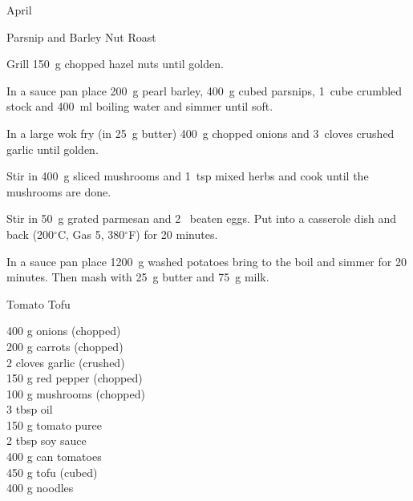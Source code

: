 \begin{menu}{April}
\begin{recipe}{2}{Parsnip and Barley Nut Roast}
\begin{ingredients}
		\end{ingredients}
	
	
    \begin{instructions}
    \item 
        Grill 150~g chopped hazel nuts until golden.
      \item 
        In a sauce pan
        place
        200~g  pearl barley,
        400~g cubed parsnips,
        1~cube crumbled stock
        and
        400~ml  boiling water
        and simmer until soft.
      \item 
        In a large wok fry
        (in 25~g  butter)
        400~g chopped onions
        and
        3~cloves crushed garlic
        until golden.
      \item 
        Stir in
        400~g sliced mushrooms
        and
        1~tsp  mixed herbs
        and cook until the mushrooms are done.
      \item 
        Stir in
        50~g grated parmesan
        and
        2~ beaten eggs.
        Put into a
        casserole dish
        and back
        (200$^{\circ}$C, Gas 5, 380$^{\circ}$F)
        for 20 minutes.
      \item 
    In a sauce pan place
    1200~g washed potatoes
    bring to the boil and simmer for 20 minutes.
    Then mash with
    25~g  butter
    and
    75~g  milk.
  
    \end{instructions}
    \end{recipe}%
  
    \begin{recipe}{2}{Tomato Tofu}%
		\begin{ingredients}
		400 g onions (chopped) \\
	200 g carrots (chopped) \\
	2 cloves garlic (crushed) \\
	150 g red pepper (chopped) \\
	100 g mushrooms (chopped) \\
	3 tbsp oil  \\
	150 g tomato puree  \\
	2 tbsp soy sauce  \\
	400 g can tomatoes  \\
	450 g tofu (cubed) \\
	400 g noodles  \\
	
		\end{ingredients}
	

\end{recipe}
\end{menu}

